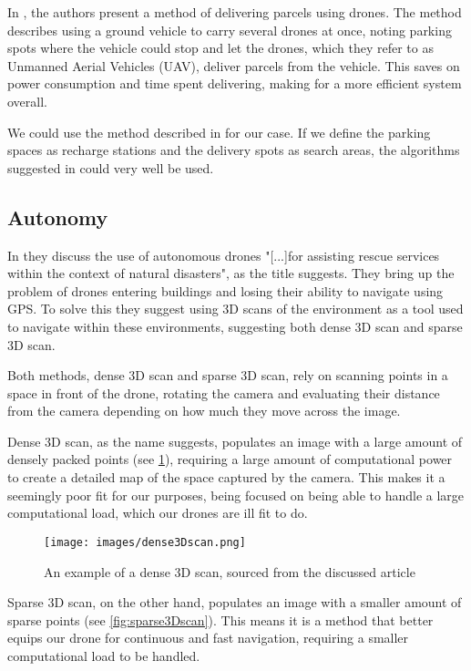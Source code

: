 \documentclass[fleqn,10pt]{wlscirep}
\newcommand{\citesup}[1]{\textsuperscript{\cite{#1}}}
\begin{document}
In \cite{Pathing}, the authors present a method of delivering parcels using drones. The method describes using a ground vehicle to carry several drones at once, noting parking spots where the vehicle could stop and let the drones, which they refer to as Unmanned Aerial Vehicles (UAV), deliver parcels from the vehicle. This saves on power consumption and time spent delivering, making for a more efficient system overall. 

We could use the method described in \cite{Pathing} for our case. If we define the parking spaces as recharge stations and the delivery spots as search areas, the algorithms suggested in \cite{Pathing} could very well be used.

\subsection{Autonomy}\label{sec:3D scan}
In \cite{Natural_Disasters} they discuss the use of autonomous drones "[...]for assisting rescue services within the context of natural disasters"\citesup{Natural_Disasters}, as the title suggests. They bring up the problem of drones entering buildings and losing their ability to navigate using GPS. To solve this they suggest using 3D scans of the environment as a tool used to navigate within these environments, suggesting both dense 3D scan and sparse 3D scan. 

Both methods, dense 3D scan and sparse 3D scan, rely on scanning points in a space in front of the drone, rotating the camera and evaluating their distance from the camera depending on how much they move across the image.

Dense 3D scan, as the name suggests, populates an image with a large amount of densely packed points (see \cref{fig:dense3Dscan}), requiring a large amount of computational power to create a detailed map of the space captured by the camera. This makes it a seemingly poor fit for our purposes, being focused on being able to handle a large computational load, which our drones are ill fit to do. 

\begin{figure}[h]
\centering
\texttt{[image: images/dense3Dscan.png]}
\caption{An example of a dense 3D scan, sourced from the discussed article\citesup{Natural_Disasters}}
\label{fig:dense3Dscan}
\end{figure}

Sparse 3D scan, on the other hand, populates an image with a smaller amount of sparse points (see \cref{fig:sparse3Dscan}). This means it is a method that better equips our drone for continuous and fast navigation, requiring a smaller computational load to be handled.
\end{document}
